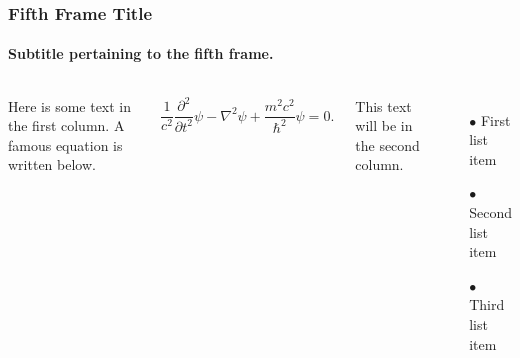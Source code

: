 \documentclass[aspectratio=169]{beamer}
\begin{document}
\begin{frame}
\frametitle{Fifth Frame Title}
\framesubtitle{Subtitle pertaining to the fifth frame.}

\begin{columns}

Here is some text in the first column. A famous equation is written below.

\begin{equation*}
    \frac{1}{c^2} \frac{\partial^2}{\partial t^2} \psi - \nabla^2 \psi + \frac{m^2 c^2}{\hbar^2} \psi = 0.
\end{equation*}

This text will be in the second column.

\begin{itemize}
    \item[$\bullet$] First list item
    \item[$\bullet$] Second list item
    \item[$\bullet$] Third list item
\end{itemize}

\end{columns}

\end{frame}
\end{document}
